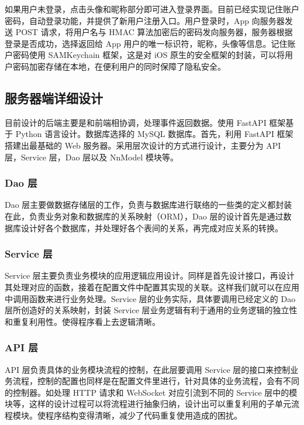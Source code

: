 如果用户未登录，点击头像和昵称部分即可进入登录界面。目前已经实现记住账户密码，自动登录功能，并提供了新用户注册入口。用户登录时，App 向服务器发送 POST 请求，将用户名与 HMAC 算法加密后的密码发向服务器，服务器根据登录是否成功，选择返回给 App 用户的唯一标识符，昵称，头像等信息。记住账户密码使用 SAMKeychain 框架，这是对 iOS 原生的安全框架的封装，可以将用户密码加密存储在本地，在便利用户的同时保障了隐私安全。

\subsection{服务器端详细设计}

目前设计的后端主要是和前端相协调，处理事件返回数据。使用 FastAPI 框架基于 Python 语言设计。数据库选择的 MySQL 数据库。首先，利用 FastAPI 框架搭建出最基础的 Web 服务器。采用层次设计的方式进行设计，主要分为 API 层，Service 层，Dao 层以及 NnModel 模块等。

\subsubsection{Dao 层}

Dao 层主要做数据存储层的工作，负责与数据库进行联络的一些类的定义都封装在此，负责业务对象和数据库的关系映射（ORM），Dao 层的设计首先是通过数据库设计好各个数据库，并处理好各个表间的关系，再完成对应关系的转换。

\subsubsection{Service 层}

Service 层主要负责业务模块的应用逻辑应用设计。同样是首先设计接口，再设计其处理对应的函数，接着在配置文件中配置其实现的关联。这样我们就可以在应用中调用函数来进行业务处理。Service 层的业务实际，具体要调用已经定义的 Dao 层所创造好的关系映射，封装 Service 层业务逻辑有利于通用的业务逻辑的独立性和重复利用性。使得程序看上去逻辑清晰。

\subsubsection{API 层}

API 层负责具体的业务模块流程的控制，在此层要调用 Service 层的接口来控制业务流程，控制的配置也同样是在配置文件里进行，针对具体的业务流程，会有不同的控制器。如处理 HTTP 请求和 WebSocket 对应引流到不同的 Service 层中的模块等，这样的设计过程可以将流程进行抽象归纳，设计出可以重复利用的子单元流程模块。使程序结构变得清晰，减少了代码重复使用造成的困扰。

